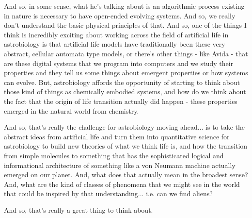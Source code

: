 \documentclass[]{article}
\begin{document}
And so, in some sense,
what he's talking about
is an algorithmic process
existing in nature
is necessary to have open-ended
evolving systems.
And so, we really don't understand
the basic physical principles of that.
And so, one of the things
I think is incredibly exciting
about working across the field
of artificial life in astrobiology
is that artificial life models have
traditionally been these very abstract,
cellular automata type models,
or there's other things - like Avida -
that are these digital systems
that we program into computers
and we study their properties
and they tell us some things
about emergent properties
or how systems can evolve.
But, astrobiology affords the opportunity
of starting to think about
those kind of things
as chemically embodied systems,
and how do we think about the fact
that the origin of life transition
actually did happen -
these properties emerged
in the natural world from chemistry.

And so, that's really the challenge
for astrobiology moving ahead...
is to take the abstract ideas
from artificial life
and turn them into quantitative science
for astrobiology to build new theories
of what we think life is,
and how the transition
from simple molecules to something
that has the sophisticated logical
and informational architecture
of something
like a von Neumann machine
actually emerged on our planet.
And, what does that actually mean
in the broadest sense?
And, what are the kind of classes
of phenomena
that we might see in the world
that could be inspired
by that understanding...
i.e. can we find aliens?

And so, that's really a great thing
to think about.



\printglossaries

 


\end{document}

